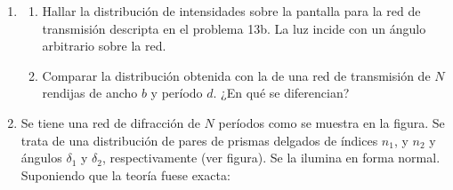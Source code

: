 \documentclass[11pt,spanish]{article}
\begin{document}
\begin{enumerate}
    \item 
    
    \begin{enumerate}
        \item Hallar la distribución de intensidades sobre la pantalla para la red
        de transmisión descripta en el problema 13b. La luz incide con un
        ángulo arbitrario sobre la red.

        \item Comparar la distribución obtenida con la de una red de transmisión
        de $N$ rendijas de ancho $b$ y período $d$. ¿En qué se diferencian? 
    \end{enumerate}


    \item Se tiene una red de difracción de $N$ períodos como se muestra en
    la figura. Se trata de una distribución de pares de prismas delgados
    de índices $n_{1}$, y $n_{2}$ y ángulos $\delta_{1}$ y $\delta_{2}$,
    respectivamente (ver figura). Se la ilumina en forma normal. Suponiendo
    que la teoría fuese exacta:


\end{enumerate}
\end{document}
